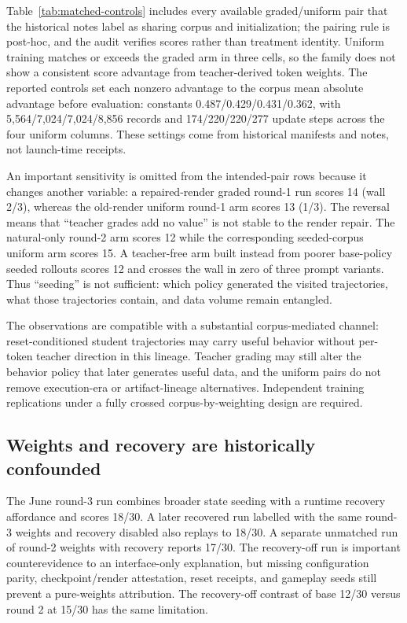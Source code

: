 \documentclass[11pt,a4paper]{article}
\begin{document}
Table~\ref{tab:matched-controls} includes every available graded/uniform pair
that the historical notes label as sharing corpus and initialization; the
pairing rule is post-hoc, and the audit verifies scores rather than treatment
identity. Uniform training matches or exceeds the graded arm in three cells,
so the family does not show a consistent score advantage from teacher-derived
token weights. The reported controls set each nonzero advantage to the corpus
mean absolute advantage before evaluation: constants
0.487/0.429/0.431/0.362, with 5,564/7,024/7,024/8,856 records and
174/220/220/277 update steps across the four uniform columns. These settings
come from historical manifests and notes, not launch-time receipts.

An important sensitivity is omitted from the intended-pair rows because it
changes another variable: a repaired-render graded round-1 run scores 14
(wall 2/3), whereas the old-render uniform round-1 arm scores 13 (1/3).
The reversal means that ``teacher grades add no value'' is not stable to the
render repair. The natural-only round-2 arm
scores 12 while the corresponding seeded-corpus uniform arm scores 15. A
teacher-free arm built instead from poorer base-policy seeded rollouts scores
12 and crosses the wall in zero of three prompt variants. Thus ``seeding'' is
not sufficient: which policy generated the visited trajectories, what those
trajectories contain, and data volume remain entangled.

The observations are compatible with a substantial corpus-mediated channel:
reset-conditioned student trajectories may carry useful behavior without
per-token teacher direction in this lineage. Teacher grading may still alter
the behavior policy that later generates useful data, and the uniform pairs do not remove
execution-era or artifact-lineage alternatives. Independent training
replications under a fully crossed corpus-by-weighting design are required.

\subsection{Weights and recovery are historically confounded}

The June round-3 run combines broader state seeding with a runtime recovery
affordance and scores 18/30. A later recovered run labelled with the same
round-3 weights and recovery disabled also replays to 18/30. A separate
unmatched run of round-2 weights with recovery reports 17/30. The recovery-off
run is important counterevidence to an interface-only explanation, but missing
configuration parity, checkpoint/render attestation, reset receipts, and
gameplay seeds still prevent a pure-weights attribution. The recovery-off
contrast of base 12/30 versus round 2 at 15/30 has the same limitation.
\end{document}
